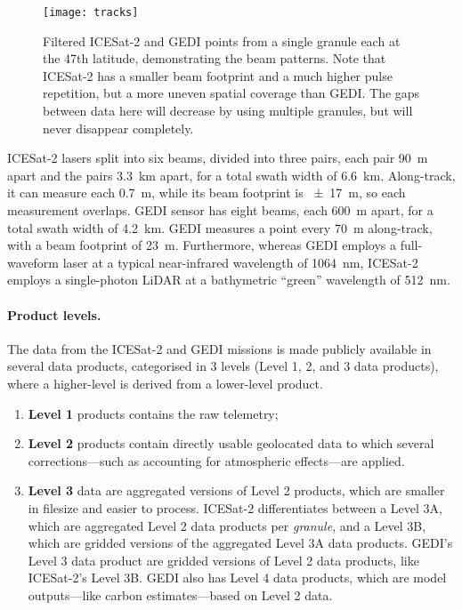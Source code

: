 %

\begin{figure}
  \centering
  \texttt{[image: tracks]}
  \caption{Filtered ICESat-2 and GEDI points from a single granule each at the 47th latitude, demonstrating the beam patterns.
    Note that ICESat-2 has a smaller beam footprint and a much higher pulse repetition, but a more uneven spatial coverage than GEDI\@.
    The gaps between data here will decrease by using multiple granules, but will never disappear completely.}%
  \label{fig:beams}
\end{figure}

ICESat-2 lasers split into six beams, divided into three pairs, each pair \qty{90}{m} apart and the pairs \qty{3.3}{km} apart, for a total swath width of \qty{6.6}{km}.
Along-track, it can measure each \qty{0.7}{m}, while its beam footprint is \qty{\pm17}{m}, so each measurement overlaps.
GEDI sensor has eight beams, each \qty{600}{m} apart, for a total swath width of \qty{4.2}{km}.
GEDI measures a point every \qty{70}{m} along-track, with a beam footprint of \qty{23}{m}.
Furthermore, whereas GEDI employs a full-waveform laser at a typical near-infrared wavelength of \qty{1064}{nm}, ICESat-2 employs a single-photon LiDAR at a bathymetric ``green'' wavelength of \qty{512}{nm}.


\paragraph{Product levels.}
The data from the ICESat-2 and GEDI missions is made publicly available in several data products, categorised in 3 levels (Level 1, 2, and 3 data products), where a higher-level is derived from a lower-level product.
\begin{enumerate}
  \item \textbf{Level 1} products contains the raw telemetry;
  \item \textbf{Level 2} products contain directly usable geolocated data to which several corrections---such as accounting for atmospheric effects---are applied.
  \item \textbf{Level 3} data are aggregated versions of Level 2 products, which are smaller in filesize and easier to process.
  ICESat-2 differentiates between a Level 3A, which are aggregated Level 2 data products per \emph{granule}, and a Level 3B, which are gridded versions of the aggregated Level 3A data products.
  GEDI's Level 3 data product are gridded versions of Level 2 data products, like ICESat-2's Level 3B.
  GEDI also has Level 4 data products, which are model outputs---like carbon estimates---based on Level 2 data.
\end{enumerate}


